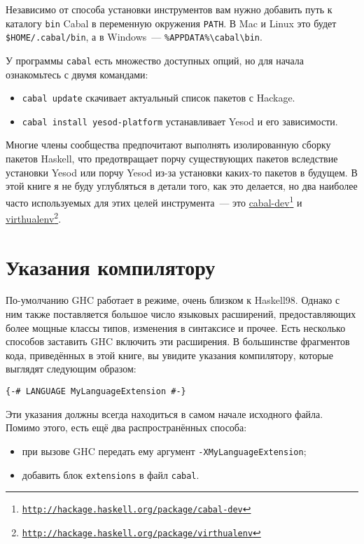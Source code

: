 Независимо от способа установки инструментов вам нужно добавить путь к каталогу \texttt{bin} Cabal в переменную окружения \texttt{PATH}. В Mac и Linux это будет \texttt{\$HOME/.cabal/bin}, а в Windows~--- \texttt{\%APPDATA\%\textbackslash{}cabal\textbackslash{}bin}.

У программы \texttt{cabal} есть множество доступных опций, но для начала ознакомьтесь с двумя командами:

\begin{itemize}
  \item \texttt{cabal update} скачивает актуальный список пакетов с Hackage.
  \item \texttt{cabal install yesod-platform} устанавливает Yesod и его зависимости.
\end{itemize}

\begin{remark}
Многие члены сообщества предпочитают выполнять изолированную сборку пакетов Haskell, что предотвращает порчу существующих пакетов вследствие установки Yesod или порчу Yesod из-за установки каких-то пакетов в будущем. В этой книге я не буду углубляться в детали того, как это делается, но два наиболее часто используемых для этих целей инструмента~--- это \href{http://hackage.haskell.org/package/cabal-dev}{cabal-dev}\footnote{\href{http://hackage.haskell.org/package/cabal-dev}{\texttt{http://hackage.haskell.org/package/cabal-dev}}} и \href{http://hackage.haskell.org/package/virthualenv}{virthualenv}\footnote{\href{http://hackage.haskell.org/package/virthualenv}{\texttt{http://hackage.haskell.org/package/virthualenv}}}.
\end{remark}

\section{Указания компилятору}

По-умолчанию GHC работает в режиме, очень близком к Haskell98. Однако с ним также поставляется большое число языковых расширений, предоставляющих более мощные классы типов, изменения в синтаксисе и прочее. Есть несколько способов заставить GHC включить эти расширения. В большинстве фрагментов кода, приведённых в этой книге, вы увидите указания компилятору, которые выглядят следующим образом:

\begin{lstlisting}
{-# LANGUAGE MyLanguageExtension #-}
\end{lstlisting}

Эти указания должны всегда находиться в самом начале исходного файла. Помимо этого, есть ещё два распространённых способа:
\begin{itemize}
\item при вызове GHC передать ему аргумент \lstinline'-XMyLanguageExtension';
\item добавить блок \texttt{extensions} в файл \texttt{cabal}.
\end{itemize}

